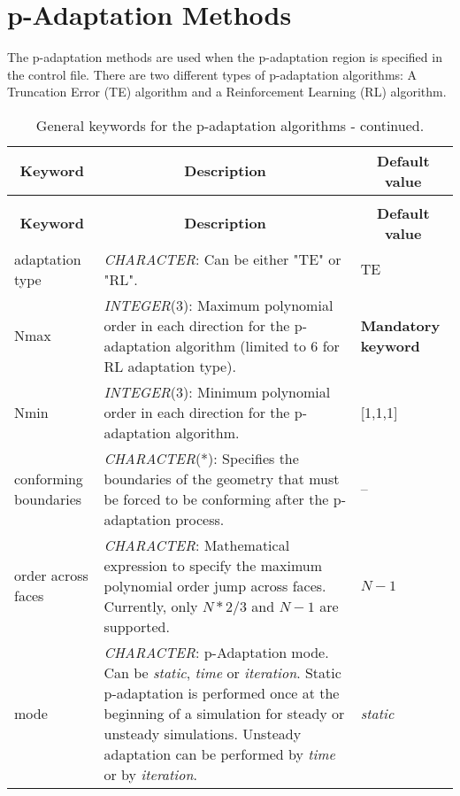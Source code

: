 \documentclass[a4paper,10pt]{report}
\begin{document}
\chapter{p-Adaptation Methods}
The p-adaptation methods are used when the p-adaptation region is specified in the control file. There are two different types of p-adaptation algorithms: A Truncation Error (TE) algorithm and a Reinforcement Learning (RL) algorithm.

\begin{longtable}{|p{4cm}|p{10cm}|p{2.2cm}|}
\caption{General keywords for the p-adaptation algorithms.} \label{tab:pAdaptationKey} \\
\hline
\multicolumn{1}{|c|}{\textbf{Keyword}} & \multicolumn{1}{c|}{\textbf{Description}} & \multicolumn{1}{c|}{\textbf{Default value}} \\ \hline
\endfirsthead

\caption{General keywords for the p-adaptation algorithms - continued.} \\
\hline
\multicolumn{1}{|c|}{\textbf{Keyword}} & \multicolumn{1}{c|}{\textbf{Description}} & \multicolumn{1}{c|}{\textbf{Default value}} \\ \hline
\endhead

adaptation type & \textit{CHARACTER}: Can be either "TE" or "RL". & TE \\ \hline

Nmax          & \textit{INTEGER}(3): Maximum polynomial order in each direction for the p-adaptation algorithm (limited to 6 for RL adaptation type). &
					\textbf{Mandatory keyword} \\ \hline

Nmin          & \textit{INTEGER}(3): Minimum polynomial order in each direction for the p-adaptation algorithm. &
					[1,1,1] \\ \hline

conforming boundaries & \textit{CHARACTER}(*): Specifies the boundaries of the geometry that must be forced to be conforming after the p-adaptation process.  	  &
					-- \\ \hline

order across faces &
			\textit{CHARACTER}: Mathematical expression to specify the maximum polynomial order jump across faces. Currently, only $N*2/3$ and $N-1$ are supported. &
					$N-1$ \\ \hline

mode &
			\textit{CHARACTER}: p-Adaptation mode. Can be \textit{static}, \textit{time} or \textit{iteration}. Static p-adaptation is performed once at the beginning of a simulation for steady or unsteady simulations. Unsteady adaptation can be performed by \textit{time} or by \textit{iteration}. &
					\textit{static} \\ \hline


\end{longtable}
\end{document}
